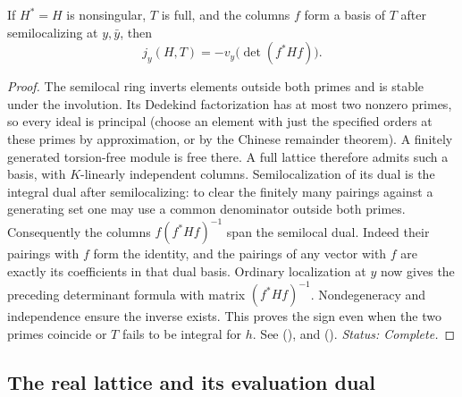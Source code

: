 \begin{lemma}\label{lem:P5-dual}
\uses{}
If $H^*=H$ is nonsingular, $T$ is full, and the columns $f$ form a basis
of $T$ after semilocalizing at $y,\bar y$, then
\[
                 j_y(H,T)=-v_y\bigl(\det(f^*Hf)\bigr).
\]
\end{lemma}
\begin{proof}
The semilocal ring inverts elements outside both primes and is stable under
the involution. Its Dedekind factorization has at most two nonzero primes,
so every ideal is principal (choose an element with just the specified
orders at these primes by approximation, or by the Chinese remainder
theorem). A finitely generated torsion-free module is free there. A full
lattice therefore admits such a basis, with $K$-linearly independent
columns. Semilocalization of its dual is the integral dual after
semilocalizing: to clear the finitely many pairings against a generating
set one may use a common denominator outside both primes. Consequently the
columns $f(f^*Hf)^{-1}$ span the semilocal dual. Indeed their pairings with
$f$ form the identity, and the pairings of any vector with $f$ are exactly
its coefficients in that dual basis. Ordinary localization at $y$ now
gives the preceding determinant formula with matrix $(f^*Hf)^{-1}$.
Nondegeneracy and independence ensure the inverse exists.
This proves the sign even when the two primes coincide or $T$ fails to be
integral for $h$.
See  (),
 and 
().
\emph{Status: Complete.}
\end{proof}

\subsection{The real lattice and its evaluation dual}

